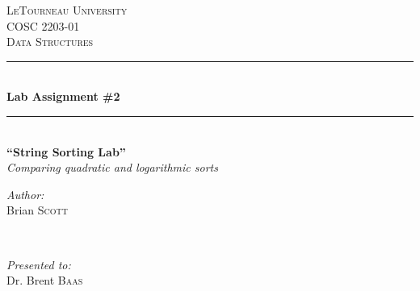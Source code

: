 \begin{titlepage}
\newcommand{\HRule}{\rule{\linewidth}{0.5mm}} %

\center %
 

\textsc{\LARGE LeTourneau University}\\[1.0cm] %
\textsc{\Large COSC 2203-01}\\[0.5cm] %
\textsc{\large Data Structures}\\[0.5cm] %


\HRule \\[0.4cm]
{ \huge \bfseries Lab Assignment \#2}\\[0.2cm] %
\HRule \\[1.5cm]
 

{\Large\bfseries ``String Sorting Lab''}\\[5mm]
{\Large \emph{Comparing quadratic and logarithmic sorts}} \\[1.5cm]


\begin{minipage}{0.35\textwidth}
	\begin{flushleft} \large
		\emph{Author:}\\
		Brian \textsc{Scott} %
	\end{flushleft}
\end{minipage}
~
\begin{minipage}{0.35\textwidth}
	\begin{flushright} \large
		\emph{Presented to:} \\
		Dr. Brent \textsc{Baas} %
	\end{flushright}
\end{minipage}\\[4cm]


\end{titlepage}
